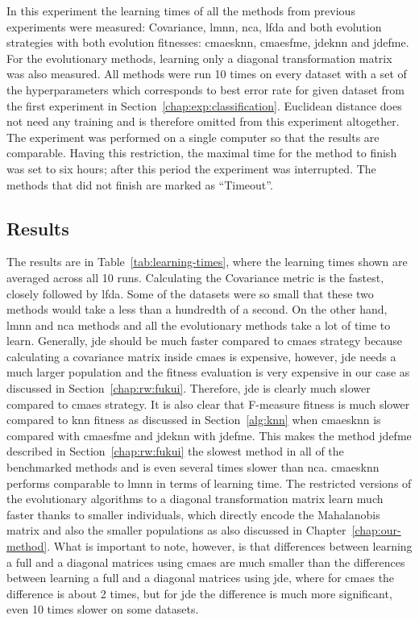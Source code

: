 In this experiment the learning times of all the methods from previous experiments were measured: Covariance, \ac{lmnn}, \ac{nca}, \ac{lfda} and both evolution strategies with both evolution fitnesses: \ac{cmaesknn}, \ac{cmaesfme}, \ac{jdeknn} and \ac{jdefme}. For the evolutionary methods, learning only a diagonal transformation matrix was also measured. All methods were run 10 times on every dataset with a set of the hyperparameters which corresponds to best error rate for given dataset from the first experiment in Section~\ref{chap:exp:classification}. Euclidean distance does not need any training and is therefore omitted from this experiment altogether. The experiment was performed on a single computer so that the results are comparable. Having this restriction, the maximal time for the method to finish was set to six hours; after this period the experiment was interrupted. The methods that did not finish are marked as ``Timeout''.

\subsection{Results}

The results are in Table~\ref{tab:learning-times}, where the learning times shown are averaged across all 10 runs. Calculating the Covariance metric is the fastest, closely followed by \ac{lfda}. Some of the datasets were so small that these two methods would take a less than a hundredth of a second. On the other hand, \ac{lmnn} and \ac{nca} methods and all the evolutionary methods take a lot of time to learn. Generally, \ac{jde} should be much faster compared to \ac{cmaes} strategy because calculating a covariance matrix inside \ac{cmaes} is expensive, however, \ac{jde} needs a much larger population and the fitness evaluation is very expensive in our case as discussed in Section~\ref{chap:rw:fukui}. Therefore, \ac{jde} is clearly much slower compared to \ac{cmaes} strategy. It is also clear that \mbox{F-measure} fitness is much slower compared to \ac{knn} fitness as discussed in Section~\ref{alg:knn} when \ac{cmaesknn} is compared with \ac{cmaesfme} and \ac{jdeknn} with \ac{jdefme}. This makes the method \ac{jdefme} described in Section~\ref{chap:rw:fukui} the slowest method in all of the benchmarked methods and is even several times slower than \ac{nca}. \ac{cmaesknn} performs comparable to \ac{lmnn} in terms of learning time. The restricted versions of the evolutionary algorithms to a diagonal transformation matrix learn much faster thanks to smaller individuals, which directly encode the Mahalanobis matrix and also the smaller populations as also discussed in Chapter~\ref{chap:our-method}. What is important to note, however, is that differences between learning a full and a diagonal matrices using \ac{cmaes} are much smaller than the differences between learning a full and a diagonal matrices using \ac{jde}, where for \ac{cmaes} the difference is about 2 times, but for \ac{jde} the difference is much more significant, even 10 times slower on some datasets.

